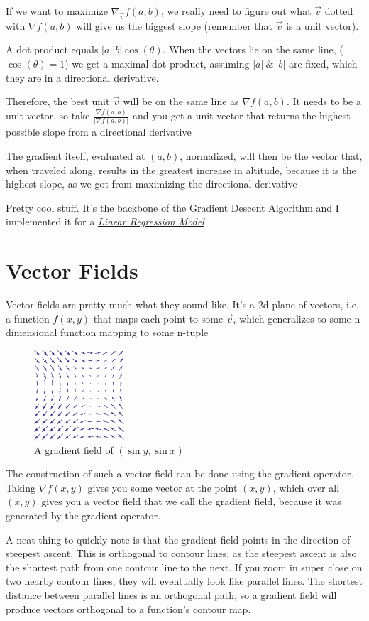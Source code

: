 \documentclass[12pt, letterpaper]{article}
\newcommand{\externalLink}[2]{\emph{\underline{\href{#1}{#2}}}}
\begin{document}
If we want to maximize $\nabla_{\vec{v}} f(a, b)$, we really need to figure out what $\vec{v}$ dotted with $\nabla f(a, b)$ will give us the biggest slope (remember that $\vec{v}$ is a unit vector).

A dot product equals $|a| |b| \cos(\theta)$. When the vectors lie on the same line, ($\cos(\theta) = 1$) we get a maximal dot product, assuming $|a|\ \&\ |b|$ are fixed, which they are in a directional derivative.

Therefore, the best unit $\vec{v}$ will be on the same line as $\nabla f(a, b)$. It needs to be a unit vector, so take $\frac{\nabla f(a, b)}{|\nabla f(a, b)|}$ and you get a unit vector that returns the highest possible slope from a directional derivative

The gradient itself, evaluated at $(a, b)$, normalized, will then be the vector that, when traveled along, results in the greatest increase in altitude, because it is the highest slope, as we got from maximizing the directional derivative

Pretty cool stuff. It's the backbone of the Gradient Descent Algorithm and I implemented it for a \externalLink{https://github.com/SAXTEN2011/LinearRegression/blob/master/index.js}{Linear Regression Model}

\section{Vector Fields}

Vector fields are pretty much what they sound like. It's a 2d plane of vectors, i.e. a function $f(x, y)$ that maps each point to some $\vec{v}$, which generalizes to some n-dimensional function mapping to some n-tuple

\begin{figure}[h]
    \centering 
    \includegraphics[width=0.30\textwidth]{gradientfield}
    \caption{A gradient field of $(\sin y, \sin x)$}
\end{figure}

The construction of such a vector field can be done using the gradient operator. Taking $\nabla f(x, y)$ gives you some vector at the point $(x, y)$, which over all $(x, y)$ gives you a vector field that we call the gradient field, because it was generated by the gradient operator. 

A neat thing to quickly note is that the gradient field points in the direction of steepest ascent. This is orthogonal to contour lines, as the steepest ascent is also the shortest path from one contour line to the next. If you zoom in super close on two nearby contour lines, they will eventually look like parallel lines. The shortest distance between parallel lines is an orthogonal path, so a gradient field will produce vectors orthogonal to a function's contour map.
\end{document}
